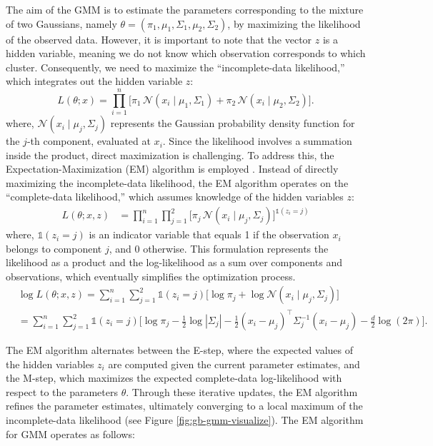 The aim of the GMM is to estimate the parameters corresponding to the mixture of two Gaussians, namely $\theta = (\pi_1, \mu_1, \Sigma_1, \mu_2, \Sigma_2)$, by maximizing the likelihood of the observed data. However, it is important to note that the vector $z$ is a hidden variable, meaning we do not know which observation corresponds to which cluster. Consequently, we need to maximize the ``incomplete-data likelihood,'' which integrates out the hidden variable $z$:
\begin{equation}
    L(\theta; x) = \prod_{i=1}^n \Big[\pi_1 \, \mathcal{N}(x_i \mid \mu_1, \Sigma_1) + \pi_2 \, \mathcal{N}(x_i \mid \mu_2, \Sigma_2)\Big].
\end{equation}
where, $\mathcal{N}(x_i \mid \mu_j, \Sigma_j)$ represents the Gaussian probability density function for the $j$-th component, evaluated at $x_i$. Since the likelihood involves a summation inside the product, direct maximization is challenging. To address this, the Expectation-Maximization (EM) algorithm is employed \cite{dempster1977maximum}. Instead of directly maximizing the incomplete-data likelihood, the EM algorithm operates on the ``complete-data likelihood,'' which assumes knowledge of the hidden variables $z$:
\begin{align}
    L(\theta; x, z) &= \prod_{i=1}^n \prod_{j=1}^2 \Big[\pi_j \, \mathcal{N}(x_i \mid \mu_j, \Sigma_j)\Big]^{\mathds{1}(z_{i} = j)}
\label{eq:gmm_complete_data1}
\end{align}
where, $\mathds{1}(z_i = j)$ is an indicator variable that equals 1 if the observation $x_i$ belongs to component $j$, and 0 otherwise. This formulation represents the likelihood as a product and the log-likelihood as a sum over components and observations, which eventually simplifies the optimization process.
\begin{align}
    &\log L(\theta; x, z) = \sum_{i=1}^n \sum_{j=1}^2 \mathds{1}(z_{i} = j) 
    \Big[\log \pi_j + \log \mathcal{N}(x_i \mid \mu_j, \Sigma_j)\Big] \nonumber \\
    &= \sum_{i=1}^n \sum_{j=1}^2 \mathds{1}(z_{i} = j) 
    \Big[\log \pi_j - \frac{1}{2} \log |\Sigma_j| 
    - \frac{1}{2} (x_i - \mu_j)^\top \Sigma_j^{-1} (x_i - \mu_j) 
    - \frac{d}{2} \log(2\pi)\Big].
\label{eq:gmm_complete_data2}
\end{align}

The EM algorithm alternates between the E-step, where the expected values of the hidden variables $z_i$ are computed given the current parameter estimates, and the M-step, which maximizes the expected complete-data log-likelihood with respect to the parameters $\theta$. Through these iterative updates, the EM algorithm refines the parameter estimates, ultimately converging to a local maximum of the incomplete-data likelihood \cite{dempster1977maximum} (see Figure \ref{fig:gb-gmm-visualize}). The EM algorithm for GMM operates as follows: 

